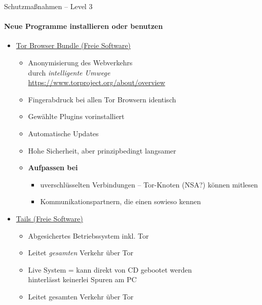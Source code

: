 \begin{frame}{Schutzmaßnahmen -- Level 3}
\framesubtitle{Neue Programme installieren oder benutzen}
  \begin{itemize}
    \item \href{https://www.torproject.org}{Tor Browser Bundle (Freie Software)}
    \begin{itemize}
      \item Anonymisierung des Webverkehrs\\durch \emph{\glqq intelligente Umwege\grqq}\\
        \scriptsize \url{https://www.torproject.org/about/overview} \normalsize
      \item Fingerabdruck bei allen Tor Browsern identisch
      \item Gewählte Plugins vorinstalliert
      \item Automatische Updates
      \item Hohe Sicherheit, aber prinzipbedingt langsamer
      \item \textbf{Aufpassen bei}
        \begin{itemize}
          \item uverschlüsselten Verbindungen -- Tor-Knoten (NSA?) können mitlesen
          \item Kommunikationspartnern, die einen sowieso kennen
        \end{itemize}
    \end{itemize}
    \pause
    \item \href{https://tails.boum.org}{Tails (Freie Software)}
    \begin{itemize}
      \item Abgesichertes Betriebssystem inkl. Tor
      \item Leitet \emph{gesamten} Verkehr über Tor
      \item Live System = kann direkt von CD gebootet werden\\ hinterlässt keinerlei Spuren am PC
      \item Leitet gesamten Verkehr über Tor
    \end{itemize}
  \end{itemize}
\end{frame}

\endinput
